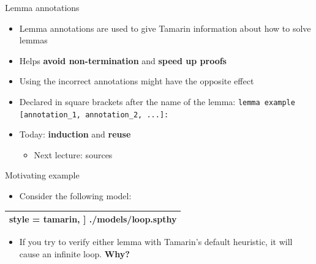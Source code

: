 \documentclass[11pt,aspectratio=169]{beamer}
\begin{document}
\begin{frame}[fragile]{Lemma annotations}
    \begin{itemize}
        \item Lemma annotations are used to give Tamarin information about how 
              to solve lemmas
        \item Helps \textbf{avoid non-termination} and \textbf{speed up proofs}
        \item Using the incorrect annotations might have the opposite effect
        \item Declared in square brackets after the name of the lemma:
           \hspace*{.5cm}\verb|lemma example [annotation_1, annotation_2, ...]:|
        \item Today: \textbf{induction} and \textbf{reuse}
        \begin{itemize}
            \item Next lecture: sources
        \end{itemize}
    \end{itemize}
\end{frame}

\begin{frame}[fragile]{Motivating example}
    \begin{itemize}
        \item Consider the following model:
    \end{itemize}
    \hspace*{.7cm}
    \begin{tabularx}{.925\linewidth}{c}
        \toprule
        
            style = tamarin,
        ] {./models/loop.spthy}\\
        \bottomrule
    \end{tabularx}
    \begin{itemize}
        \item If you try to verify either lemma with Tamarin's default 
              heuristic, it will cause an infinite loop. \textbf{Why?}
    \end{itemize}
\end{frame}
\end{document}
